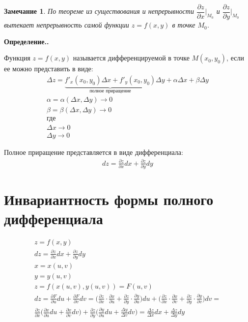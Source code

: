 \documentclass[a4paper,12pt,oneside]{extbook}
\newcommand{\newpar}{$ $\par\nobreak\ignorespaces}
\newenvironment{definition}[1][]{\noindent\textbf{Определение.\if\relax\detokenize{#1}\relax\else\;#1.\fi}\newpar}{}
\theoremstyle{numbered}
\theoremstyle{unnumbered}
\theoremstyle{named}
\theoremstyle{unnumbered}
\theoremstyle{named}
\theoremstyle{named}
\theoremstyle{named}
\newtheorem*{note}{Замечание}
\begin{document}
\begin{note}
    По теореме из существования и непрерывности \(\dfrac{\partial z}{\partial x} \Big|_{M_0}\) и \(\dfrac{\partial z}{\partial y} \Big|_{M_0}\) вытекает непрерывность самой функции \(z = f(x, y)\) в точке \(M_0\).
\end{note}

\begin{definition}
    Функция \(z = f(x, y)\) называется дифференцируемой в точке \(M(x_0, y_0)\), если ее можно представить в виде:
    \begin{gather*}
        \Delta z = \underbrace{f'_x(x_0, y_0) \Delta x + f'_y(x_0, y_0)}_\text{полное приращение} \Delta y + \alpha \Delta x + \beta \Delta y \\
        \alpha = \alpha(\Delta x, \Delta y) \to 0 \\
        \beta = \beta(\Delta x, \Delta y) \to 0 \\
        \text{где} \\
        \Delta x \to 0 \\
        \Delta y \to 0
    \end{gather*}

    Полное приращение представляется в виде дифференциала:
    \begin{gather*}
        dz = \frac{\partial z}{\partial x} dx + \frac{\partial z}{\partial y} dy
    \end{gather*}
\end{definition}

\section{Инвариантность формы полного дифференциала}%
\label{sec:Инвариантность формы полного дифференциала}

\begin{gather*}
    z = f(x, y) \\
    dz = \frac{\partial z}{\partial x} dx + \frac{\partial z}{\partial y} dy \\
    x = x(u, v) \\
    y = y(u, v) \\
    z = f(x(u, v), y(u, v)) = F(u, v) \\
    dz = \frac{\partial F}{\partial u} du + \frac{\partial F}{\partial v} dv =
    \Big( \frac{\partial z}{\partial x} \cdot \frac{\partial x}{\partial u} + \frac{\partial z}{\partial y} \cdot \frac{\partial y}{\partial u} \Big) du + \Big( \frac{\partial z}{\partial x} \cdot \frac{\partial x}{\partial v} + \frac{\partial z}{\partial y} \cdot \frac{\partial y}{\partial v} \Big) dv = \\
    \frac{\partial z}{\partial x} \Big( \frac{\partial x}{\partial u}du + \frac{\partial x}{\partial v}dv \Big) + \frac{\partial z}{\partial y} \Big( \frac{\partial y}{\partial u}du + \frac{\Delta y}{\Delta v}dv \Big) =
    \frac{\Delta z}{\Delta x} dx + \frac{\Delta z}{\Delta y} dy
\end{gather*}
\end{document}
